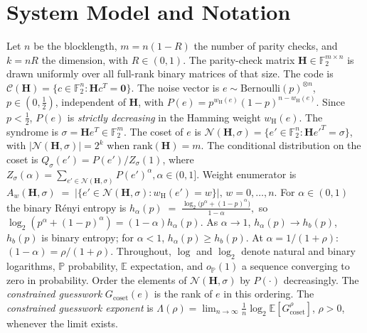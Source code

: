 \documentclass[journal,10pt,onecolumn]{IEEEtran}
\newcommand{\Fb}{\mathbb{F}}
\newcommand{\Eb}{\mathbb{E}}
\newcommand{\Pb}{\mathbb{P}}
\newcommand{\wH}{w_{\mathrm{H}}}
\newcommand{\Nb}{\mathcal{N}}
\newcommand{\Cb}{\mathcal{C}}
\newcommand{\Hb}{h_b}
\newcommand{\Hm}{\mathbf{H}}
\begin{document}
\section{System Model and Notation}
\label{sec:model}

Let $n$ be the blocklength, $m=n(1-R)$ the number of parity checks,
and $k=nR$ the dimension, with $R\in(0,1)$.
The parity-check matrix $\Hm \in\Fb_2^{m\times n}$ is drawn uniformly
over all full-rank binary matrices of that size.
The code is $\Cb(\Hm)=\{c\in\Fb_2^n:\Hm c^T=\bm{0}\}$.
The noise vector is $e\sim\mathrm{Bernoulli}(p)^{\otimes n}$,
$p\in(0,\tfrac{1}{2})$, independent of $\Hm$, with
$P(e)=p^{\wH(e)}(1-p)^{n-\wH(e)}$.
Since $p<\tfrac{1}{2}$, $P(e)$ is \emph{strictly decreasing}
in the Hamming weight $\wH(e)$.
The syndrome is $\sigma=\Hm e^T\in\Fb_2^m$.
The coset of $e$ is
$\Nb(\Hm,\sigma)=\{e'\in\Fb_2^n:\Hm e'^T=\sigma\}$,
with $|\Nb(\Hm,\sigma)|=2^k$ when $\mathrm{rank}(\Hm)=m$.
The conditional distribution on the coset is
$Q_\sigma(e')=P(e')/Z_{\sigma} (1)$, where
\(
    Z_{\sigma} (\alpha)=
    \sum_{e'\in\Nb(\Hm,\sigma)}P(e')^\alpha,
     \alpha\in(0,1].
\)
Weight enumerator is
\(
    A_w(\Hm,\sigma)
    \;=\;
    \bigl|\bigl\{e'\in\Nb(\Hm,\sigma):\wH(e')=w\bigr\}\bigr|,
    \, w=0,\ldots,n.
\)
For $\alpha\in(0,1)$ the binary R\'{e}nyi entropy is
\(
    h_\alpha(p)
    \;=\;
    \frac{\log_2\!\bigl(p^\alpha+(1-p)^\alpha\bigr)}{1-\alpha},
\)
so $\log_2(p^\alpha+(1-p)^\alpha)=(1-\alpha)h_\alpha(p)$.
As $\alpha\to 1$, $h_\alpha(p)\to\Hb(p)$, \(\Hb(p)\) is binary entropy; for $\alpha<1$,
$h_\alpha(p)\ge\Hb(p)$.
At $\alpha=1/(1+\rho)$: $(1-\alpha)=\rho/(1+\rho)$.
Throughout, $\log$ and $\log_2$ denote natural and binary logarithms,
$\Pb$ probability, $\Eb$ expectation, and $o_{\Pb}(1)$ a sequence converging
to zero in probability.
Order the elements of $\Nb(\Hm,\sigma)$ by $P(\cdot)$ decreasingly.
The \emph{constrained guesswork} $G_{\mathrm{coset}}(e)$ is the
rank of $e$ in this ordering.
The \emph{constrained guesswork exponent} is
$\Lambda(\rho)=\lim_{n\to\infty}\frac{1}{n}\log_2\Eb[G_{\mathrm{coset}}^\rho]$,
$\rho>0$, whenever the limit exists.
\end{document}

